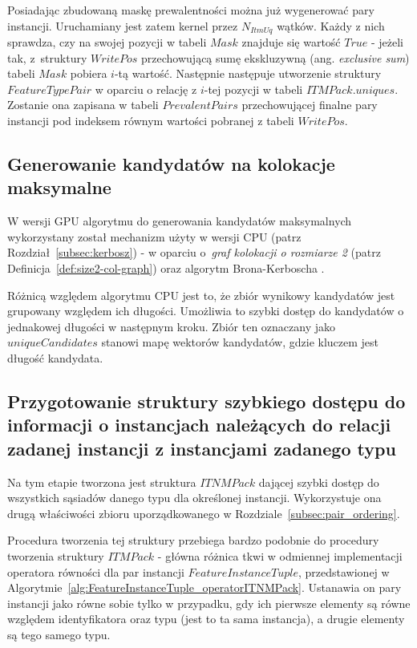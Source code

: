 \documentclass[12pt]{article}
\begin{document}
Posiadając zbudowaną maskę prewalentności można już wygenerować pary instancji. Uruchamiany jest zatem kernel przez $ N_{ItmUq} $ wątków. Każdy z nich sprawdza, czy na swojej pozycji w tabeli $ Mask $ znajduje się wartość $ True $ - jeżeli tak, z~struktury $ WritePos $ przechowującą sumę ekskluzywną (ang. \textit{exclusive sum}) tabeli $ Mask $ pobiera $i$-tą wartość. Następnie następuje utworzenie struktury \linebreak $ FeatureTypePair $ w oparciu o relację z $ i $-tej pozycji w tabeli $ ITMPack.uniques$. Zostanie ona zapisana w tabeli $ PrevalentPairs $ przechowującej finalne pary instancji pod indeksem równym wartości pobranej z tabeli $ WritePos $.

\subsection{Generowanie kandydatów na kolokacje maksymalne}

W wersji GPU algorytmu do generowania kandydatów maksymalnych wykorzystany został mechanizm użyty w wersji CPU (patrz Rozdział~\ref{subsec:kerbosz}) -  w oparciu o~\textit{graf kolokacji o rozmiarze 2} (patrz Definicja~\ref{def:size2-col-graph}) oraz algorytm Brona-Kerboscha \cite{kerbosz}.

Różnicą względem algorytmu CPU jest to, że zbiór wynikowy kandydatów jest grupowany względem ich długości. Umożliwia to szybki dostęp do kandydatów o jednakowej długości w następnym kroku. Zbiór ten oznaczany jako $ uniqueCandidates $ stanowi mapę wektorów kandydatów, gdzie kluczem jest długość kandydata.

\subsection{Przygotowanie struktury szybkiego dostępu do informacji o instancjach należących do relacji zadanej instancji z instancjami zadanego typu}

Na tym etapie tworzona jest struktura $ ITNMPack $ dającej szybki dostęp do wszystkich sąsiadów danego typu dla określonej instancji. Wykorzystuje ona drugą właściwości zbioru uporządkowanego w Rozdziale~\ref{subsec:pair_ordering}.

Procedura tworzenia tej struktury przebiega bardzo podobnie do procedury tworzenia struktury $ ITMPack $ - główna różnica tkwi w odmiennej implementacji operatora równości dla par instancji $ FeatureInstanceTuple $, przedstawionej w Algorytmie~\ref{alg:FeatureInstanceTuple_operatorITNMPack}. Ustanawia on pary instancji jako równe sobie tylko w przypadku, gdy ich pierwsze elementy są równe względem identyfikatora oraz typu (jest to ta sama instancja), a drugie elementy są tego samego typu.
\end{document}
